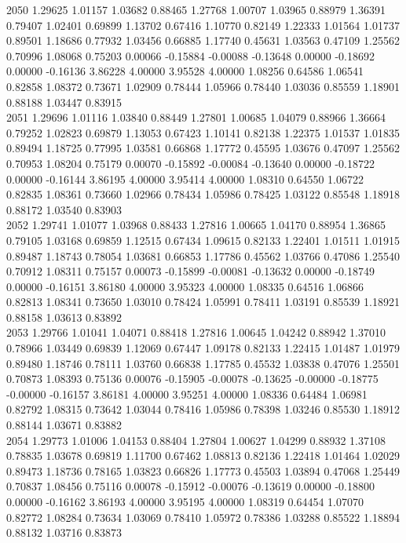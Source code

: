 {2050 1.29625 1.01157 1.03682 0.88465 1.27768 1.00707 1.03965 0.88979 1.36391 0.79407 1.02401 0.69899 1.13702 0.67416 1.10770 0.82149 1.22333 1.01564 1.01737 0.89501 1.18686 0.77932 1.03456 0.66885 1.17740 0.45631 1.03563 0.47109 1.25562 0.70996 1.08068 0.75203 0.00066 -0.15884 -0.00088 -0.13648 0.00000 -0.18692 0.00000 -0.16136 3.86228 4.00000 3.95528 4.00000 1.08256 0.64586 1.06541 0.82858 1.08372 0.73671 1.02909 0.78444 1.05966 0.78440 1.03036 0.85559 1.18901 0.88188 1.03447 0.83915 \\
2051 1.29696 1.01116 1.03840 0.88449 1.27801 1.00685 1.04079 0.88966 1.36664 0.79252 1.02823 0.69879 1.13053 0.67423 1.10141 0.82138 1.22375 1.01537 1.01835 0.89494 1.18725 0.77995 1.03581 0.66868 1.17772 0.45595 1.03676 0.47097 1.25562 0.70953 1.08204 0.75179 0.00070 -0.15892 -0.00084 -0.13640 0.00000 -0.18722 0.00000 -0.16144 3.86195 4.00000 3.95414 4.00000 1.08310 0.64550 1.06722 0.82835 1.08361 0.73660 1.02966 0.78434 1.05986 0.78425 1.03122 0.85548 1.18918 0.88172 1.03540 0.83903 \\
2052 1.29741 1.01077 1.03968 0.88433 1.27816 1.00665 1.04170 0.88954 1.36865 0.79105 1.03168 0.69859 1.12515 0.67434 1.09615 0.82133 1.22401 1.01511 1.01915 0.89487 1.18743 0.78054 1.03681 0.66853 1.17786 0.45562 1.03766 0.47086 1.25540 0.70912 1.08311 0.75157 0.00073 -0.15899 -0.00081 -0.13632 0.00000 -0.18749 0.00000 -0.16151 3.86180 4.00000 3.95323 4.00000 1.08335 0.64516 1.06866 0.82813 1.08341 0.73650 1.03010 0.78424 1.05991 0.78411 1.03191 0.85539 1.18921 0.88158 1.03613 0.83892 \\
2053 1.29766 1.01041 1.04071 0.88418 1.27816 1.00645 1.04242 0.88942 1.37010 0.78966 1.03449 0.69839 1.12069 0.67447 1.09178 0.82133 1.22415 1.01487 1.01979 0.89480 1.18746 0.78111 1.03760 0.66838 1.17785 0.45532 1.03838 0.47076 1.25501 0.70873 1.08393 0.75136 0.00076 -0.15905 -0.00078 -0.13625 -0.00000 -0.18775 -0.00000 -0.16157 3.86181 4.00000 3.95251 4.00000 1.08336 0.64484 1.06981 0.82792 1.08315 0.73642 1.03044 0.78416 1.05986 0.78398 1.03246 0.85530 1.18912 0.88144 1.03671 0.83882 \\
2054 1.29773 1.01006 1.04153 0.88404 1.27804 1.00627 1.04299 0.88932 1.37108 0.78835 1.03678 0.69819 1.11700 0.67462 1.08813 0.82136 1.22418 1.01464 1.02029 0.89473 1.18736 0.78165 1.03823 0.66826 1.17773 0.45503 1.03894 0.47068 1.25449 0.70837 1.08456 0.75116 0.00078 -0.15912 -0.00076 -0.13619 0.00000 -0.18800 0.00000 -0.16162 3.86193 4.00000 3.95195 4.00000 1.08319 0.64454 1.07070 0.82772 1.08284 0.73634 1.03069 0.78410 1.05972 0.78386 1.03288 0.85522 1.18894 0.88132 1.03716 0.83873 \\
}
